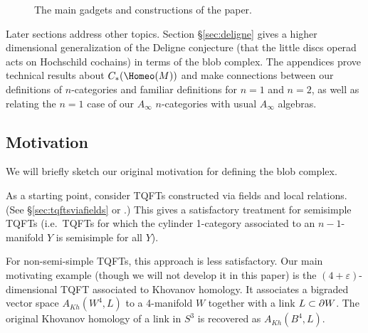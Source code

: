 \begin{figure}[t]
{
\endpgfgraphicnamed%
\mbox{} %
}
\caption{The main gadgets and constructions of the paper.}
\label{fig:outline}
\end{figure}

Later sections address other topics.
Section \S \ref{sec:deligne} gives
a higher dimensional generalization of the Deligne conjecture 
(that the little discs operad acts on Hochschild cochains) in terms of the blob complex.
The appendices prove technical results about $\CH{M}$ and
make connections between our definitions of $n$-categories and familiar definitions for $n=1$ and $n=2$, 
as well as relating the $n=1$ case of our $A_\infty$ $n$-categories with usual $A_\infty$ algebras. 



\subsection{Motivation}
\label{sec:motivations}

We will briefly sketch our original motivation for defining the blob complex.

As a starting point, consider TQFTs constructed via fields and local relations.
(See \S\ref{sec:tqftsviafields} or \cite{kw:tqft}.)
This gives a satisfactory treatment for semisimple TQFTs
(i.e.\ TQFTs for which the cylinder 1-category associated to an
$n{-}1$-manifold $Y$ is semisimple for all $Y$).

For non-semi-simple TQFTs, this approach is less satisfactory.
Our main motivating example (though we will not develop it in this paper)
is the $(4{+}\varepsilon)$-dimensional TQFT associated to Khovanov homology.
It associates a bigraded vector space $A_{Kh}(W^4, L)$ to a 4-manifold $W$ together
with a link $L \subset \partial W$.
The original Khovanov homology of a link in $S^3$ is recovered as $A_{Kh}(B^4, L)$.

